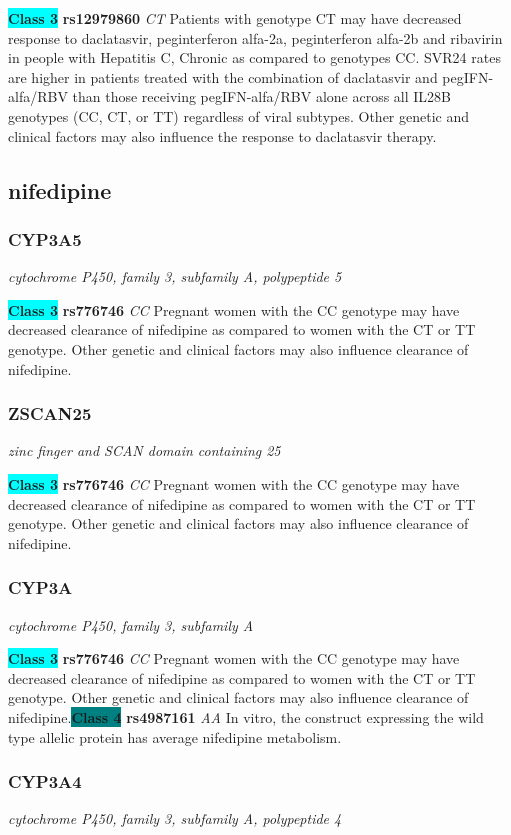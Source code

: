 \documentclass{report}
\begin{document}
\textbf{\colorbox{cyan} {Class 3}} \textbf{ rs12979860 } \textit{ CT }
Patients with genotype CT may have decreased response to daclatasvir, peginterferon alfa-2a, peginterferon alfa-2b and ribavirin in people with Hepatitis C, Chronic as compared to genotypes CC. SVR24 rates are higher in patients treated with the combination of daclatasvir and pegIFN-alfa/RBV than those receiving pegIFN-alfa/RBV alone across all IL28B genotypes (CC, CT, or TT) regardless of viral subtypes. Other genetic and clinical factors may also influence the response to daclatasvir therapy.\newline\subsection{ nifedipine }\subsubsection{ CYP3A5 }
\textit{ cytochrome P450, family 3, subfamily A, polypeptide 5 }

\textbf{\colorbox{cyan} {Class 3}} \textbf{ rs776746 } \textit{ CC }
Pregnant women with the CC genotype may have decreased clearance of nifedipine as compared to women with the CT or TT genotype. Other genetic and clinical factors may also influence clearance of nifedipine.\newline\subsubsection{ ZSCAN25 }
\textit{ zinc finger and SCAN domain containing 25 }

\textbf{\colorbox{cyan} {Class 3}} \textbf{ rs776746 } \textit{ CC }
Pregnant women with the CC genotype may have decreased clearance of nifedipine as compared to women with the CT or TT genotype. Other genetic and clinical factors may also influence clearance of nifedipine.\newline\subsubsection{ CYP3A }
\textit{ cytochrome P450, family 3, subfamily A }

\textbf{\colorbox{cyan} {Class 3}} \textbf{ rs776746 } \textit{ CC }
Pregnant women with the CC genotype may have decreased clearance of nifedipine as compared to women with the CT or TT genotype. Other genetic and clinical factors may also influence clearance of nifedipine.\newline\textbf{\colorbox{teal} {Class 4}} \textbf{ rs4987161 } \textit{ AA }
In vitro, the construct expressing the wild type allelic protein has average nifedipine metabolism.\newline\subsubsection{ CYP3A4 }
\textit{ cytochrome P450, family 3, subfamily A, polypeptide 4 }
\end{document}
